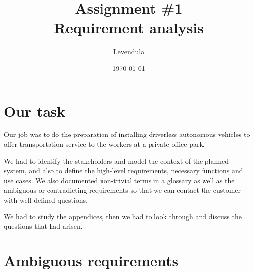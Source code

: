 \documentclass[a4paper]{article}
\title{Assignment \#1 \\ Requirement analysis}
\author{Levendula}
\date{\today}
\begin{document}


\tableofcontents
\clearpage

\section{Our task}


Our job was to do the preparation of installing \gls{driverless}
\gls{autonomous} \gls{vehicle}s to offer \gls{transportation} service to the
workers at a private office park.

We had to identify the \gls{stakeholder}s and model the context of the planned
system, and also to define the high-level requirements, necessary functions and
use cases. We also documented non-trivial terms in a glossary as well as the
ambiguous or contradicting requirements so that we can contact the customer with
well-defined questions.

We had to study the appendices, then we had to look through and discuss the
questions that had arisen.


\section{Ambiguous requirements}
\end{document}
